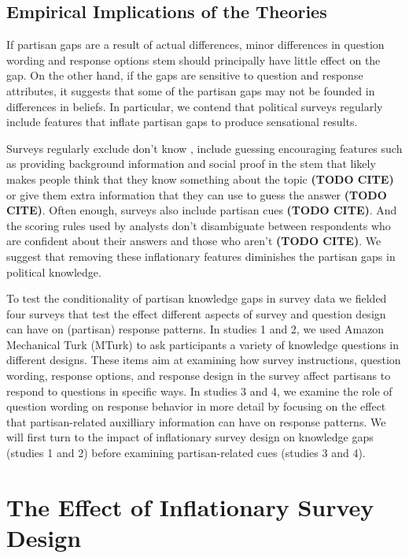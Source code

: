 \documentclass[12pt, letterpaper]{article}
\begin{document}
\subsection*{Empirical Implications of the Theories}

If partisan gaps are a result of actual differences, minor differences in question wording and response options stem should principally have little effect on the gap. On the other hand, if the gaps are sensitive to question and response attributes, it suggests that some of the partisan gaps may not be founded in differences in beliefs. In particular, we contend that political surveys regularly include features that inflate partisan gaps to produce sensational results.

Surveys regularly exclude don't know \citep{luskin2011don}, include guessing encouraging features such as providing background information and social proof in the stem that likely makes people think that they know something about the topic \textbf{(TODO CITE)} or give them extra information that they can use to guess the answer \textbf{(TODO CITE)}. Often enough, surveys also include partisan cues \textbf{(TODO CITE)}. And the scoring rules used by analysts don't disambiguate between respondents who are confident about their answers and those who aren't \textbf{(TODO CITE)}. We suggest that removing these inflationary features diminishes the partisan gaps in political knowledge.

To test the conditionality of partisan knowledge gaps in survey data we fielded four surveys that test the effect different aspects of survey and question design can have on (partisan) response patterns. In studies 1 and 2, we used Amazon Mechanical Turk (MTurk) to ask participants a variety of knowledge questions in different designs. These items aim at examining how survey instructions, question wording, response options, and response design in the survey affect partisans to respond to questions in specific ways. In studies 3 and 4, we examine the role of question wording on response behavior in more detail by focusing on the effect that partisan-related auxilliary information can have on response patterns. We will first turn to the impact of inflationary survey design on knowledge gaps (studies 1 and 2) before examining partisan-related cues (studies 3 and 4).

\newpage

\section*{The Effect of Inflationary Survey Design}
\label{sec:inflationary_measures}
\end{document}
